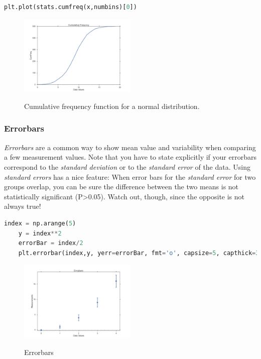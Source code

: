 \begin{lstlisting}[language=Python]
    plt.plot(stats.cumfreq(x,numbins)[0])
\end{lstlisting}

\begin{figure}[H]
  \centering
  \includegraphics[width=0.5\textwidth]{../Images/CumulativeFrequencyFunction.png}\\
  \caption{Cumulative frequency function for a normal distribution.}
\end{figure}

\subsubsection{Errorbars}

\emph{Errorbars} are a common way to show mean value and variability when comparing a few measurement values. Note that you have to state explicitly if your errorbars correspond to the \emph{standard deviation} or to the \emph{standard error} of the data. Using \emph{standard errors} has a nice feature: When error bars for the \emph{standard error} for two groups overlap, you can be sure the difference between the two means is not statistically significant (P>0.05). Watch out, though, since the opposite is not always true!

\begin{lstlisting}[language=Python]
    index = np.arange(5)
    y = index**2
    errorBar = index/2
    plt.errorbar(index,y, yerr=errorBar, fmt='o', capsize=5, capthick=3)
\end{lstlisting}

\begin{figure}[H]
  \centering
  \includegraphics[width=0.5\textwidth]{../Images/Errorbars.png}\\
  \caption{Errorbars}
\end{figure}


